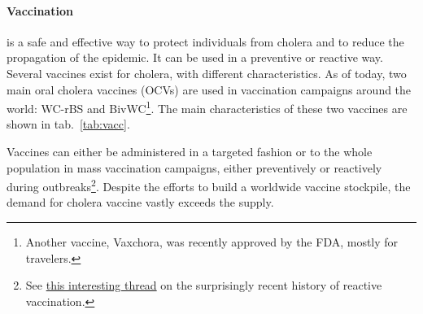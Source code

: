 \paragraph{Vaccination} is a safe and effective way to protect individuals from cholera and to reduce the propagation of the epidemic. It can be used in a preventive or reactive way. Several vaccines exist for cholera, with different characteristics. As of today, two main oral cholera vaccines (OCVs) are used in vaccination campaigns around the world: WC-rBS and BivWC\footnote[][-3\baselineskip]{Another vaccine, Vaxchora, was recently approved by the FDA, mostly for travelers.}. The main characteristics of these two vaccines are shown in tab.~\ref{tab:vacc}.

Vaccines can either be administered in a targeted fashion or to the whole population in mass vaccination campaigns, either preventively or reactively during outbreaks\footnote[][-5.5\baselineskip]{See \href{twitter.com/TheFerrariLab/status/1340681737316294659}{this interesting thread} on the surprisingly recent history of reactive vaccination.}. Despite the efforts to build a worldwide vaccine stockpile, the demand for cholera vaccine vastly exceeds the supply\cite[-5\baselineskip]{Parker:AdaptingGlobalShortage:2017a,Seidlein:PreventingCholeraOutbreaks:2018}.
 
